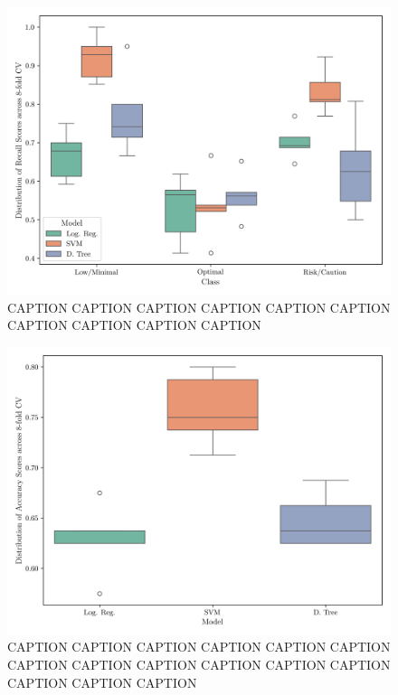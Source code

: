 \documentclass[conference]{IEEEtran}
\begin{document}
\begin{figure}[H]
    \centering
    \includegraphics[width=1\linewidth]{assets/box_recall.png}
    \caption{CAPTION CAPTION CAPTION CAPTION CAPTION CAPTION CAPTION CAPTION CAPTION CAPTION}
    \label{box_recall}
\end{figure}

\begin{figure}[H]
    \centering
    \includegraphics[width=1\linewidth]{assets/box_accuracy.png}
    \caption{CAPTION CAPTION CAPTION CAPTION CAPTION CAPTION CAPTION CAPTION CAPTION CAPTION CAPTION CAPTION CAPTION CAPTION CAPTION}
    \label{box_accuracy}
\end{figure}
\end{document}

